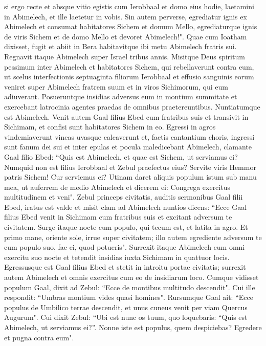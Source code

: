 \begin{biblechapter}
\verse si ergo recte et absque vitio egistis cum Ierobbaal et domo eius hodie, laetamini in Abimelech, et ille laetetur in vobis. 
\verse Sin autem perverse, egrediatur ignis ex Abimelech et consumat habitatores Sichem et domum Mello, egrediaturque ignis de viris Sichem et de domo Mello et devoret Abimelech!". 
\verse Quae cum Ioatham dixisset, fugit et abiit in Bera habitavitque ibi metu Abimelech fratris sui. 
\verse Regnavit itaque Abimelech super Israel tribus annis. 
\verse Misitque Deus spiritum pessimum inter Abimelech et habitatores Sichem, qui rebellaverunt contra eum, 
\verse ut scelus interfectionis septuaginta filiorum Ierobbaal et effusio sanguinis eorum veniret super Abimelech fratrem suum et in viros Sichimorum, qui eum adiuverant. 
\verse Posueruntque insidias adversus eum in montium summitate et exercebant latrocinia agentes praedas de omnibus praetereuntibus. Nuntiatumque est Abimelech. 
\verse Venit autem Gaal filius Ebed cum fratribus suis et transivit in Sichimam, et confisi sunt habitatores Sichem in eo. 
\verse Egressi in agros vindemiaverunt vineas uvasque calcaverunt et, factis cantantium choris, ingressi sunt fanum dei sui et inter epulas et pocula maledicebant Abimelech, 
\verse clamante Gaal filio Ebed: “Quis est Abimelech, et quae est Sichem, ut serviamus ei? Numquid non est filius Ierobbaal et Zebul praefectus eius? Servite viris Hemmor patris Sichem! Cur serviemus ei? 
\verse Utinam daret aliquis populum istum sub manu mea, ut auferrem de medio Abimelech et dicerem ei: Congrega exercitus multitudinem et veni". 
\verse Zebul princeps civitatis, auditis sermonibus Gaal filii Ebed, iratus est valde 
\verse et misit clam ad Abimelech nuntios dicens: “Ecce Gaal filius Ebed venit in Sichimam cum fratribus suis et excitant adversum te civitatem. 
\verse Surge itaque nocte cum populo, qui tecum est, et latita in agro. 
\verse Et primo mane, oriente sole, irrue super civitatem; illo autem egrediente adversum te cum populo suo, fac ei, quod potueris". 
\verse Surrexit itaque Abimelech cum omni exercitu suo nocte et tetendit insidias iuxta Sichimam in quattuor locis. 
\verse Egressusque est Gaal filius Ebed et stetit in introitu portae civitatis; surrexit autem Abimelech et omnis exercitus cum eo de insidiarum loco. 
\verse Cumque vidisset populum Gaal, dixit ad Zebul: “Ecce de montibus multitudo descendit". Cui ille respondit: “Umbras montium vides quasi homines". 
\verse Rursumque Gaal ait: “Ecce populus de Umbilico terrae descendit, et unus cuneus venit per viam Quercus Augurum". 
\verse Cui dixit Zebul: “Ubi est nunc os tuum, quo loquebaris: “Quis est Abimelech, ut serviamus ei?”. Nonne iste est populus, quem despiciebas? Egredere et pugna contra eum". 

\end{biblechapter}
